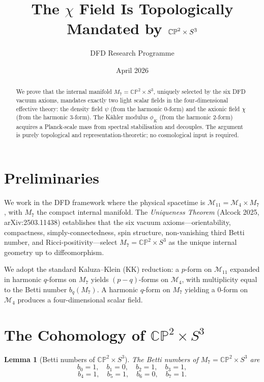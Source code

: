 \documentclass[12pt,a4paper]{article}
\title{The $\chi$ Field Is Topologically Mandated by $\CP^2 \times S^3$}
\author{DFD Research Programme}
\date{April 2026}
\newtheorem{lemma}[theorem]{Lemma}
\theoremstyle{definition}
\theoremstyle{remark}
\newcommand{\CP}{\mathbb{CP}}
\begin{document}
\maketitle

\begin{abstract}
We prove that the internal manifold $M_7 = \CP^2 \times S^3$, uniquely
selected by the six DFD vacuum axioms, mandates exactly two light scalar
fields in the four-dimensional effective theory: the density field $\psi$
(from the harmonic $0$-form) and the axionic field $\chi$ (from the
harmonic $3$-form).  The K\"ahler modulus $\phi_K$ (from the harmonic
$2$-form) acquires a Planck-scale mass from spectral stabilisation and
decouples.  The argument is purely topological and representation-theoretic;
no cosmological input is required.
\end{abstract}

\section{Preliminaries}

We work in the DFD framework where the physical spacetime is
$\mathcal{M}_{11} = \mathcal{M}_4 \times M_7$, with $M_7$ the compact
internal manifold.  The \emph{Uniqueness Theorem} (Alcock 2025,
arXiv:2503.11438) establishes that the six vacuum axioms---orientability,
compactness, simply-connectedness, spin structure, non-vanishing third
Betti number, and Ricci-positivity---select $M_7 = \CP^2 \times S^3$
as the unique internal geometry up to diffeomorphism.

We adopt the standard Kaluza--Klein (KK) reduction: a $p$-form on
$\mathcal{M}_{11}$ expanded in harmonic $q$-forms on $M_7$ yields
$(p-q)$-forms on $\mathcal{M}_4$, with multiplicity equal to the Betti
number $b_q(M_7)$.  A harmonic $q$-form on $M_7$ yielding a $0$-form
on $\mathcal{M}_4$ produces a four-dimensional scalar field.

\section{The Cohomology of $\CP^2 \times S^3$}

\begin{lemma}[Betti numbers of $\CP^2 \times S^3$]\label{lem:betti}
The Betti numbers of $M_7 = \CP^2 \times S^3$ are
\[
  b_0 = 1, \quad b_1 = 0, \quad b_2 = 1, \quad b_3 = 1,
\]
\[
  b_4 = 1, \quad b_5 = 1, \quad b_6 = 0, \quad b_7 = 1.
\]
\end{lemma}
\end{document}
